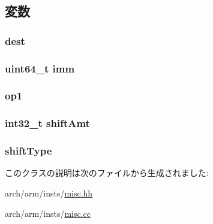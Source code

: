 \subsection{変数}
\hypertarget{classRegImmRegShiftOp_aec72e8e45bdc87abeeeb75d2a8a9a716}{
\subsubsection[{dest}]{ {\bf dest}}}
\label{classRegImmRegShiftOp_aec72e8e45bdc87abeeeb75d2a8a9a716}
\hypertarget{classRegImmRegShiftOp_a2b4406ad2843b5aa12d244d01d8fdc69}{
\subsubsection[{imm}]{\setlength{\rightskip}{0pt plus 5cm}uint64\_\-t {\bf imm}}}
\label{classRegImmRegShiftOp_a2b4406ad2843b5aa12d244d01d8fdc69}
\hypertarget{classRegImmRegShiftOp_a4c465c43ad568f8bcf8ae71480e9cfea}{
\subsubsection[{op1}]{ {\bf op1}}}
\label{classRegImmRegShiftOp_a4c465c43ad568f8bcf8ae71480e9cfea}
\hypertarget{classRegImmRegShiftOp_a378dfadeb317c390962c147be928d92d}{
\subsubsection[{shiftAmt}]{\setlength{\rightskip}{0pt plus 5cm}int32\_\-t {\bf shiftAmt}}}
\label{classRegImmRegShiftOp_a378dfadeb317c390962c147be928d92d}
\hypertarget{classRegImmRegShiftOp_ae5b7df4bd366c5419743bf5f679485b9}{
\subsubsection[{shiftType}]{ {\bf shiftType}}}
\label{classRegImmRegShiftOp_ae5b7df4bd366c5419743bf5f679485b9}


このクラスの説明は次のファイルから生成されました:\begin{DoxyCompactItemize}
\item 
arch/arm/insts/\hyperlink{arch_2arm_2insts_2misc_8hh}{misc.hh}\item 
arch/arm/insts/\hyperlink{arch_2arm_2insts_2misc_8cc}{misc.cc}\end{DoxyCompactItemize}
